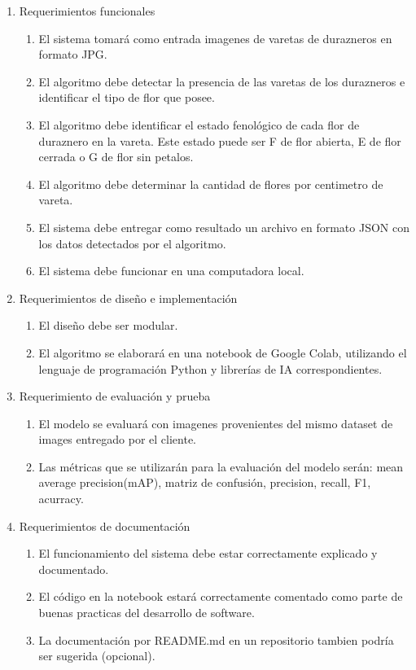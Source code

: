 \documentclass[
11pt, %
]{charter}
\begin{document}
\begin{enumerate}
	\item Requerimientos funcionales
		\begin{enumerate}
			\item El sistema tomará como entrada imagenes de varetas de durazneros en formato JPG.			
			\item El algoritmo debe detectar la presencia de las varetas de los durazneros e identificar el tipo de flor que posee.			        \item El algoritmo debe identificar el estado fenológico de cada flor de duraznero en la vareta. Este estado puede ser F de flor abierta, E de flor cerrada o G de flor sin petalos. 
			\item El algoritmo debe determinar la cantidad de flores por centimetro de vareta.
			\item El sistema debe entregar como resultado un archivo en formato JSON con los datos detectados por el algoritmo.
			\item El sistema debe funcionar en una computadora local.
		\end{enumerate}
	\item Requerimientos de diseño e implementación
		\begin{enumerate}
			\item El diseño debe ser modular.
			\item El algoritmo se elaborará en una notebook de Google Colab, utilizando el lenguaje de  programación Python y librerías de IA correspondientes. 
		\end{enumerate}
	\item Requerimiento de evaluación y prueba
	\begin{enumerate}
			\item El modelo se evaluará con imagenes provenientes del mismo dataset de images entregado por el cliente.
			 \item Las métricas que se utilizarán para la evaluación del modelo serán: mean average precision(mAP), matriz de confusión, precision, recall, F1, acurracy.
		\end{enumerate}
	\item Requerimientos de documentación
	\begin{enumerate}
			\item El funcionamiento del sistema debe estar correctamente explicado y documentado.
			 \item El código en la notebook estará correctamente comentado como parte de buenas practicas del desarrollo de software.
			 \item La documentación por README.md en un repositorio tambien podría ser sugerida (opcional).
		\end{enumerate}
\end{enumerate}
\end{document}

